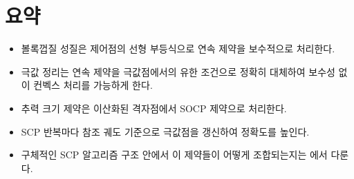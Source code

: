 \documentclass[11pt]{article}
\begin{document}
\section{요약}

\begin{itemize}
  \item 볼록껍질 성질은 제어점의 선형 부등식으로 연속 제약을 보수적으로 처리한다.
  \item 극값 정리는 연속 제약을 극값점에서의 유한 조건으로 정확히 대체하여
        보수성 없이 컨벡스 처리를 가능하게 한다.
  \item 추력 크기 제약은 이산화된 격자점에서 SOCP 제약으로 처리한다.
  \item SCP 반복마다 참조 궤도 기준으로 극값점을 갱신하여 정확도를 높인다.
  \item 구체적인 SCP 알고리즘 구조 안에서 이 제약들이 어떻게 조합되는지는
        \cite{report006}에서 다룬다.
\end{itemize}



\end{document}
